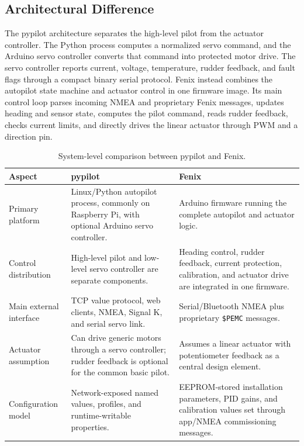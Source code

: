 \documentclass[11pt,twocolumn]{article}
\begin{document}
\subsection{Architectural Difference}
The pypilot architecture separates the high-level pilot from the actuator
controller.  The Python process computes a normalized servo command, and
the Arduino servo controller converts that command into protected motor
drive.  The servo controller reports current, voltage, temperature, rudder
feedback, and fault flags through a compact binary serial protocol.
Fenix instead combines the autopilot state machine and actuator control in
one firmware image.  Its main control loop parses incoming NMEA and
proprietary Fenix messages, updates heading and sensor state, computes the
pilot command, reads rudder feedback, checks current limits, and directly
drives the linear actuator through PWM and a direction pin.
\begin{table}[t]
\centering
\caption{System-level comparison between pypilot and Fenix.}
\label{tab:pypilot-fenix-architecture}
\begin{tabularx}{\textwidth}{Z{0.18\textwidth}YY}
\toprule
Aspect & pypilot & Fenix \\
\midrule
Primary platform &
Linux/Python autopilot process, commonly on Raspberry Pi, with optional
Arduino servo controller. &
Arduino firmware running the complete autopilot and actuator logic. \\
Control distribution &
High-level pilot and low-level servo controller are separate components. &
Heading control, rudder feedback, current protection, calibration, and
actuator drive are integrated in one firmware. \\
Main external interface &
TCP value protocol, web clients, NMEA, Signal K, and serial servo link. &
Serial/Bluetooth NMEA plus proprietary \texttt{\$PEMC} messages. \\
Actuator assumption &
Can drive generic motors through a servo controller; rudder feedback is
optional for the common basic pilot. &
Assumes a linear actuator with potentiometer feedback as a central design
element. \\
Configuration model &
Network-exposed named values, profiles, and runtime-writable properties. &
EEPROM-stored installation parameters, PID gains, and calibration values
set through app/NMEA commissioning messages. \\
\bottomrule
\end{tabularx}
\end{table}
\end{document}
